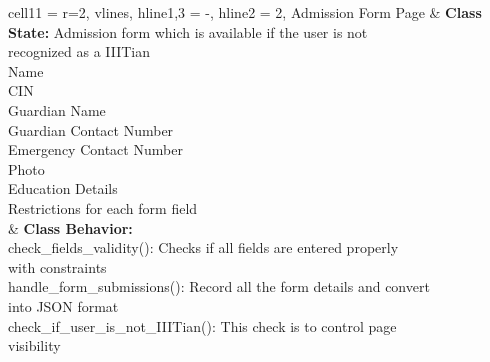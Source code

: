 \documentclass[11pt]{article}
\begin{document}
\begin{longtblr}[
  label = none,
  entry = none,
]{
  cell{1}{1} = {r=2}{},
  vlines,
  hline{1,3} = {-}{},
  hline{2} = {2}{},
}
Admission Form Page & {\textbf{Class State:} Admission form which is available if the user is not \\
recognized as a IIITian\\
\hspace{\dimexpr\labelsep+0.5\tabcolsep}Name\\
\hspace{\dimexpr\labelsep+0.5\tabcolsep}CIN\\
\hspace{\dimexpr\labelsep+0.5\tabcolsep}Guardian Name\\
\hspace{\dimexpr\labelsep+0.5\tabcolsep}Guardian Contact Number\\
\hspace{\dimexpr\labelsep+0.5\tabcolsep}Emergency Contact Number\\
\hspace{\dimexpr\labelsep+0.5\tabcolsep}Photo\\
\hspace{\dimexpr\labelsep+0.5\tabcolsep}Education Details\\
\hspace{\dimexpr\labelsep+0.5\tabcolsep}Restrictions for each form field} \\
                    & {\textbf{Class Behavior:}\\
\hspace{\dimexpr\labelsep+0.5\tabcolsep}check\_fields\_validity(): Checks if all fields are entered properly\\
 with constraints\\
\hspace{\dimexpr\labelsep+0.5\tabcolsep}handle\_form\_submissions(): Record all the form details and convert\\
 into JSON format\\
\hspace{\dimexpr\labelsep+0.5\tabcolsep}check\_if\_user\_is\_not\_IIITian(): This check is to control page\\
 visibility}
\end{longtblr}

\pagebreak
\end{document}
